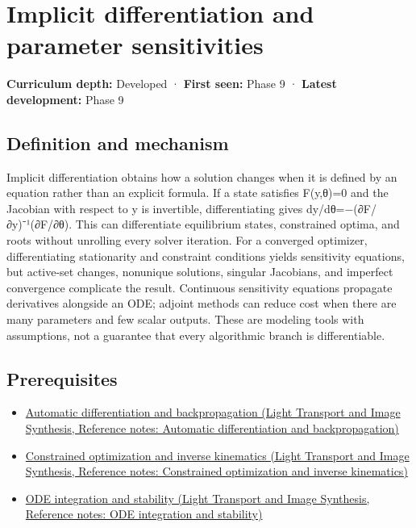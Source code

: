 \hypertarget{appendix-8836553d56fc}{}\label{referencestart:appendix-8836553d56fc}
\section{Implicit differentiation and parameter sensitivities}\label{appendix-8836553d56fc-implicit-differentiation-and-parameter-sensitivities}

\textbf{Curriculum depth:} Developed · \textbf{First seen:} Phase 9 · \textbf{Latest development:} Phase 9

\subsection{Definition and mechanism}\label{appendix-8836553d56fc-definition-and-mechanism}

Implicit differentiation obtains how a solution changes when it is defined by an equation rather than an explicit formula. If a state satisfies F(y,θ)=0 and the Jacobian with respect to y is invertible, differentiating gives dy/dθ=−(∂F/∂y)⁻¹(∂F/∂θ). This can differentiate equilibrium states, constrained optima, and roots without unrolling every solver iteration. For a converged optimizer, differentiating stationarity and constraint conditions yields sensitivity equations, but active-set changes, nonunique solutions, singular Jacobians, and imperfect convergence complicate the result. Continuous sensitivity equations propagate derivatives alongside an ODE; adjoint methods can reduce cost when there are many parameters and few scalar outputs. These are modeling tools with assumptions, not a guarantee that every algorithmic branch is differentiable.

\subsection{Prerequisites}\label{appendix-8836553d56fc-prerequisites}

\begin{itemize}
\tightlist
\item
  \href{../04-Light-Transport-and-Image-Synthesis/main.pdf\#nameddest=appendix-40df0855b4a7}{Automatic differentiation and backpropagation (Light Transport and Image Synthesis, Reference notes: Automatic differentiation and backpropagation)}
\item
  \href{../04-Light-Transport-and-Image-Synthesis/main.pdf\#nameddest=appendix-29f4bea4c2bb}{Constrained optimization and inverse kinematics (Light Transport and Image Synthesis, Reference notes: Constrained optimization and inverse kinematics)}
\item
  \href{../04-Light-Transport-and-Image-Synthesis/main.pdf\#nameddest=appendix-18eacf61a04b}{ODE integration and stability (Light Transport and Image Synthesis, Reference notes: ODE integration and stability)}
\end{itemize}

